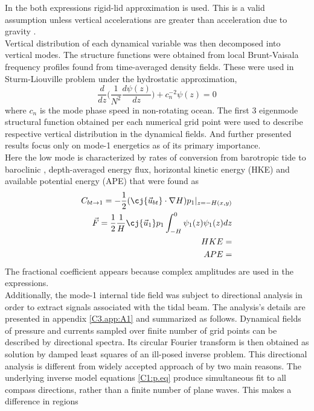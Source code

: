 \documentclass[12pt]{article}
\begin{document}
In the both expressions rigid-lid approximation is used. This is a valid assumption unless 
vertical accelerations are greater than acceleration due to gravity \citep{kelly2010}.\\
Vertical distribution of each dynamical variable was then decomposed into vertical modes. The 
structure functions were 
obtained from local Brunt-Vaisala frequency profiles found from time-averaged density fields. 
These were used in Sturm-Liouville problem under the hydrostatic approximation,
\begin{equation}
\frac{d}{dz}\Big( \frac{1}{N^2}  \frac{d \psi(z)}{dz}\Big) + c^{-2}_n \psi(z) 
= 0
\end{equation}
where $c_n$ is the mode phase speed in non-rotating ocean. The first 3 eigenmode structural 
function obtained per each numerical grid point were used to describe respective vertical 
distribution in the dynamical fields. And further presented results focus only on mode-1 energetics 
as of its primary importance.\\
Here the low mode is characterized by rates of conversion from barotropic tide to baroclinic 
\citep{simmons2004internal, kurapov2003m}, depth-averaged energy flux, horizontal kinetic energy 
(HKE) and available potential energy (APE) that were found as
\begin{align}
\label{C3.eq:conv}
C_{bt\to 1} = -\frac{1}{2}(\cj{\vec{u}_{bt}} \cdot \nabla H) p_{1}|_{z = -H(x,y)}\\
\vec{F} = \frac{1}{2} \frac{1}{H} \cj{\vec{u}_1} p_1 \int_{-H}^{0} \psi_1(z) \psi_1(z) dz\\
HKE = \\
APE = 
\end{align}
The fractional coefficient appears because complex amplitudes are used in the expressions.\\
Additionally, the mode-1 internal tide field was subject to directional analysis in order to 
extract signals associated with the tidal beam. The analysis's details are presented in 
appendix \ref{C3.app:A1} and summarized as follows. Dynamical fields of pressure and currents 
sampled over 
finite number of grid points can be described by directional spectra. Its circular 
Fourier transform is then obtained as solution by damped least squares of an ill-posed inverse 
problem. This directional analysis is 
different from widely accepted approach of \cite{zhao2010long} by two main reasons. The underlying 
inverse model equations \eqref{C1:p.eq} produce simultaneous fit to all 
compass 
directions, rather than a finite number of plane waves. This makes a difference in regions 
\end{document}
